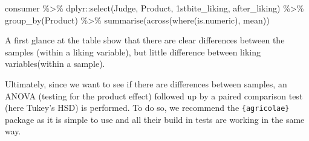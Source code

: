 \documentclass[
]{book}
\newenvironment{Shaded}{\begin{snugshade}}{\end{snugshade}}
\newcommand{\AttributeTok}[1]{\textcolor[rgb]{0.77,0.63,0.00}{#1}}
\newcommand{\FunctionTok}[1]{\textcolor[rgb]{0.00,0.00,0.00}{#1}}
\newcommand{\NormalTok}[1]{#1}
\newcommand{\OtherTok}[1]{\textcolor[rgb]{0.56,0.35,0.01}{#1}}
\newcommand{\SpecialCharTok}[1]{\textcolor[rgb]{0.00,0.00,0.00}{#1}}
\newcommand{\StringTok}[1]{\textcolor[rgb]{0.31,0.60,0.02}{#1}}
\begin{document}
\begin{Shaded}
\begin{Highlighting}[]
\NormalTok{consumer }\SpecialCharTok{\%\textgreater{}\%} 
\NormalTok{  dplyr}\SpecialCharTok{::}\FunctionTok{select}\NormalTok{(Judge, Product, }\StringTok{\textasciigrave{}}\AttributeTok{1stbite\_liking}\StringTok{\textasciigrave{}}\NormalTok{, }\StringTok{\textasciigrave{}}\AttributeTok{after\_liking}\StringTok{\textasciigrave{}}\NormalTok{) }\SpecialCharTok{\%\textgreater{}\%} 
  \FunctionTok{group\_by}\NormalTok{(Product) }\SpecialCharTok{\%\textgreater{}\%} 
  \FunctionTok{summarise}\NormalTok{(}\FunctionTok{across}\NormalTok{(}\FunctionTok{where}\NormalTok{(is.numeric), mean))}
\end{Highlighting}
\end{Shaded}

A first glance at the table show that there are clear differences between the samples (within a liking variable), but little difference between liking variables(within a sample).

Ultimately, since we want to see if there are differences between samples, an ANOVA (testing for the product effect) followed up by a paired comparison test (here Tukey's HSD) is performed. To do so, we recommend the \texttt{\{agricolae\}} package as it is simple to use and all their build in tests are working in the same way.

\begin{Shaded}
\end{Shaded}
\end{document}
